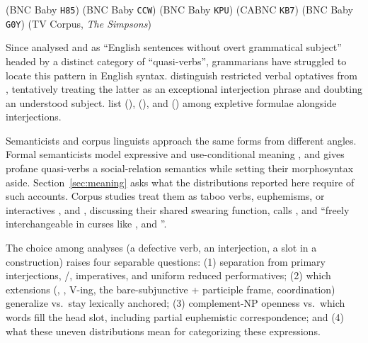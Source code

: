 \documentclass[12pt]{article}
\begin{document}
\ea\label{ex:intro-paradigm}
\ea {} \hfill (BNC Baby \texttt{H85})
\ex {} \hfill (BNC Baby \texttt{CCW})
\ex {} \hfill (BNC Baby \texttt{KPU})
\ex {} \hfill (CABNC \texttt{KB7})
\ex {} \hfill (BNC Baby \texttt{G0Y})
\ex {} \hfill (TV Corpus, \emph{The Simpsons})
\z
\z

Since \textcite[3--7]{quang1971} analysed  and  as \enquote{English sentences without overt grammatical subject} headed by a distinct category of \enquote{quasi-verbs}, grammarians have struggled to locate this pattern in English syntax. \textcite[236, 944, 1361 n.\ 70]{huddleston2002} distinguish restricted verbal optatives from , tentatively treating the latter as an exceptional interjection phrase and doubting an understood subject. \textcite[852--853]{quirk1985} list  (),  (), and  () among expletive formulae alongside interjections.

Semanticists and corpus linguists approach the same forms from different angles. Formal semanticists model expressive and use-conditional meaning \citep{potts2007,gutzmann2013,gutzmann2015,gutzmann2019}, and \textcite[4]{portner2026} gives profane quasi-verbs a social-relation semantics while setting their morphosyntax aside. Section~\ref{sec:meaning} asks what the distributions reported here require of such accounts. Corpus studies treat them as taboo verbs, euphemisms, or interactives \citep{mcenery2006,allanburridge2006,napolihoeksema2009,ljung2011,heine2023interactives}, and \textcite[13]{ljung2011}, discussing their shared swearing function, calls ,  and  \enquote{freely interchangeable in curses like ,  and }.

The choice among analyses (a defective verb, an interjection, a slot in a construction) raises four separable questions: (1) separation from primary interjections, /, imperatives, and uniform reduced performatives; (2) which extensions (, ,  V-ing, the bare-subjunctive  + participle frame, coordination) generalize vs.\ stay lexically anchored; (3) complement-NP openness vs.\ which words fill the head slot, including partial euphemistic correspondence; and (4) what these uneven distributions mean for categorizing these expressions.
\end{document}
